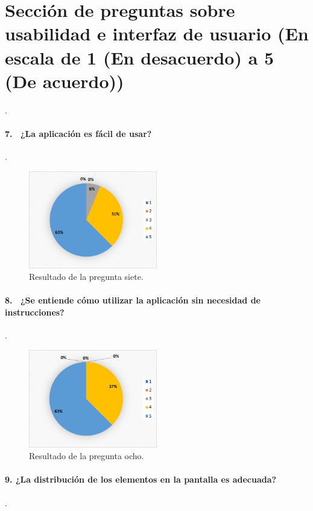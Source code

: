 \section{Sección de preguntas sobre usabilidad e interfaz de usuario (En escala de 1 (En desacuerdo) a 5 (De acuerdo))}.

\paragraph{7.  ¿La aplicación es fácil de usar?}.

\begin{figure}[h]
    \centering
    \includegraphics[width=0.5\textwidth]{Imagenes/Pregunta7.png}
    \caption{\label{fig: Pregunta7}Resultado de la pregunta siete.}
\end{figure}

\paragraph{8.  ¿Se entiende cómo utilizar la aplicación sin necesidad de instrucciones?}.

\begin{figure}[h]
    \centering
    \includegraphics[width=0.5\textwidth]{Imagenes/Pregunta8.png}
    \caption{\label{fig: Pregunta8}Resultado de la pregunta ocho.}
\end{figure}

\paragraph{9. ¿La distribución de los elementos en la pantalla es adecuada?}.

